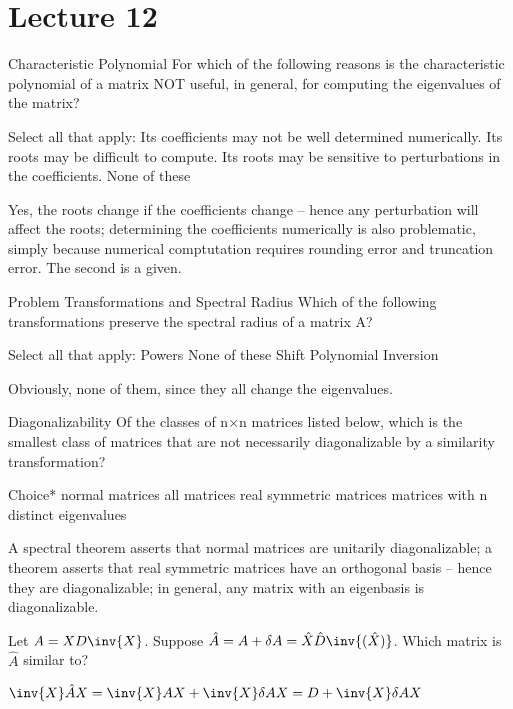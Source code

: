 \documentclass[../main.tex]{subfiles}
\begin{document}
\section{Lecture 12}

\begin{problem}
    Characteristic Polynomial
For which of the following reasons is the characteristic polynomial of a matrix NOT useful, in general, for computing the eigenvalues of the matrix?

Select all that apply:
Its coefficients may not be well determined numerically.
Its roots may be difficult to compute.
Its roots may be sensitive to perturbations in the coefficients.
None of these
\end{problem}

\begin{solution}
    Yes, the roots change if the coefficients change -- hence any perturbation will affect the roots; determining the coefficients numerically is also problematic, simply because numerical comptutation requires rounding error and truncation error. The second is a given.
\end{solution}

\begin{problem}
    Problem Transformations and Spectral Radius
Which of the following transformations preserve the spectral radius of a matrix A?

Select all that apply:
Powers
None of these
Shift
Polynomial
Inversion
\end{problem}
\begin{solution}
    Obviously, none of them, since they all change the eigenvalues.
\end{solution}

\begin{problem}
    Diagonalizability
Of the classes of n×n matrices listed below, which is the smallest class of matrices that are not necessarily diagonalizable by a similarity transformation?

Choice*
normal matrices
all matrices
real symmetric matrices
matrices with n distinct eigenvalues
\end{problem}
\begin{solution}
    A spectral theorem asserts that normal matrices are unitarily diagonalizable; a theorem asserts that real symmetric matrices have an orthogonal basis -- hence they are diagonalizable; in general, any matrix with an eigenbasis is diagonalizable.
\end{solution}

\begin{problem}
    Let $A = XD\inv{X}$. Suppose $\hat{A} = A + \delta A = \hat{X} \hat{D} \inv{(\hat{X})}$. Which matrix is $\hat{A}$ similar to?
\end{problem}

\begin{solution}
    $\inv{X}\hat{A} X = \inv{X}AX + \inv{X}\delta A X = D + \inv{X} \delta A X$
\end{solution}
\end{document}
